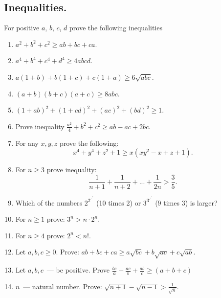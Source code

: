 \documentclass[a4paper,12pt]{article}
\begin{document}

\begin{center}
\section*{Inequalities.}
\end{center}

For positive $a$, $b$, $c$, $d$ prove the following inequalities

\medskip\medskip\medskip

\begin{enumerate}
 \item $a^{2}+b^{2}+c^{2}\geq ab+bc+ca$.

\item $a^{4}+b^{4}+c^{4}+d^{4}\geq 4abcd$.

\item $a(1+b)+b(1+c)+c(1+a)\geq 6\sqrt{abc}$.

\item $(a+b)(b+c)(a+c)\geq 8abc$.

\item $(1+ab)^{2}+(1+cd)^{2}+(ac)^{2}+(bd)^{2}\geq 1$.

\item Prove inequality $\frac{a^{2}}{4}+b^{2}+c^{2}\geq ab-ac+2bc$.

\item For any $x,y,z$ prove the following: $$x^{4}+y^{4}+z^{2}+1\geq x(xy^{2}-x+z+1).$$

\item For $n\geq3$ prove inequality: $$\frac{1}{n+1}+\frac{1}{n+2}+...+\frac{1}{2n}>\frac{3}{5}.$$

\item Which of the numbers $2^{2^{.^{.^{.^{2}}}}}$ (10 times 2) or $3^{3^{.^{.^{.^{3}}}}}$ (9 times 3) is larger?

\item For $n\geq1$ prove: $3^{n}>n\cdot 2^{n}$.

\item For $n\geq4$ prove: $2^{n}<n!$.

\item Let $a,b,c\geq0$. Prove: $ab+bc+ca\geq a\sqrt{bc}+b\sqrt{ac}+c\sqrt{ab}$.

\item Let $a,b,c$~--- be positive. Prove $\frac{bc}{a}+\frac{ac}{b}+\frac{ab}{c}\geq (a+b+c)$

\item $n$~--- natural number. Prove: $\sqrt{n+1}-\sqrt{n-1}>\frac{1}{\sqrt{n}}$.

\end{enumerate}
\end{document}
